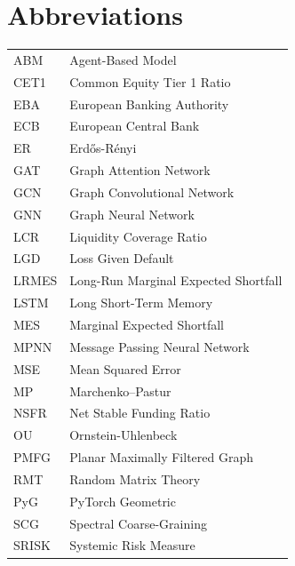 \documentclass[11pt,a4paper]{report}
\begin{document}
\section*{Abbreviations}
\vspace{-0.5em}
\begin{longtable}{@{}p{2.2cm}p{10cm}@{}}
ABM & Agent-Based Model \\
CET1 & Common Equity Tier 1 Ratio \\
EBA & European Banking Authority \\
ECB & European Central Bank \\
ER & Erd\H{o}s-R\'enyi \\
GAT & Graph Attention Network \\
GCN & Graph Convolutional Network \\
GNN & Graph Neural Network \\
LCR & Liquidity Coverage Ratio \\
LGD & Loss Given Default \\
LRMES & Long-Run Marginal Expected Shortfall \\
LSTM & Long Short-Term Memory \\
MES & Marginal Expected Shortfall \\
MPNN & Message Passing Neural Network \\
MSE & Mean Squared Error \\
MP & Marchenko--Pastur \\
NSFR & Net Stable Funding Ratio \\
OU & Ornstein-Uhlenbeck \\
PMFG & Planar Maximally Filtered Graph \\
RMT & Random Matrix Theory \\
PyG & PyTorch Geometric \\
SCG & Spectral Coarse-Graining \\
SRISK & Systemic Risk Measure \\
\end{longtable}
\end{document}
